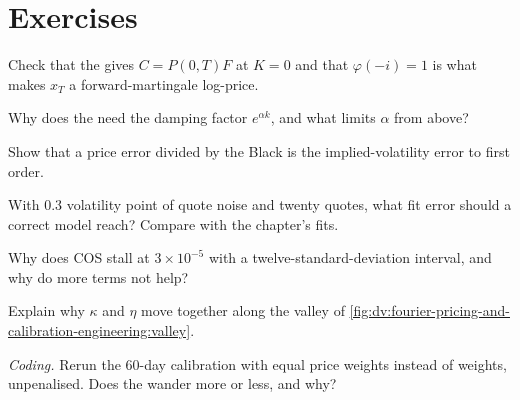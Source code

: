 \section{Exercises}

\begin{exercise}[$\star$]\label{exo:dv:fourier-pricing-and-calibration-engineering:1}
Check that the  gives $C=P(0,T)F$ at $K=0$ and that $\varphi(-i)=1$ is what makes $x_T$ a forward-martingale log-price.
\end{exercise}

\begin{exercise}[$\star$]\label{exo:dv:fourier-pricing-and-calibration-engineering:2}
Why does the  need the damping factor $e^{\alpha k}$, and what limits $\alpha$ from above?
\end{exercise}

\begin{exercise}[$\star$]\label{exo:dv:fourier-pricing-and-calibration-engineering:3}
Show that a price error divided by the Black  is the implied-volatility error to first order.
\end{exercise}

\begin{exercise}[$\star\star$]\label{exo:dv:fourier-pricing-and-calibration-engineering:4}
With 0.3 volatility point of quote noise and twenty quotes, what fit error should a correct model reach? Compare with the chapter's fits.
\end{exercise}

\begin{exercise}[$\star\star$]\label{exo:dv:fourier-pricing-and-calibration-engineering:5}
Why does COS stall at $3\times10^{-5}$ with a twelve-standard-deviation interval, and why do more terms not help?
\end{exercise}

\begin{exercise}[$\star\star$]\label{exo:dv:fourier-pricing-and-calibration-engineering:6}
Explain why $\kappa$ and $\eta$ move together along the valley of \cref{fig:dv:fourier-pricing-and-calibration-engineering:valley}.
\end{exercise}

\begin{exercise}[$\star\star\star$]\label{exo:dv:fourier-pricing-and-calibration-engineering:7}
\emph{Coding.} Rerun the 60-day calibration with equal price weights instead of  weights, unpenalised. Does the 
wander more or less, and why?
\end{exercise}

